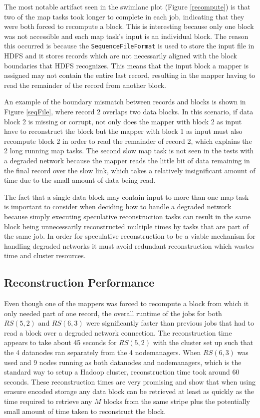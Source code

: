 \documentclass{ucetd}
\newcommand{\code}[1]{\texttt{#1}}
\begin{document}
The most notable artifact seen in the swimlane plot (Figure \ref{recompute}) is
that two of the map tasks took longer to complete in each job, indicating that
they were both forced to recompute a block. This is interesting because only one
block was not accessible and each map task's input is an individual block. The
reason this occurred is because the \code{SequenceFileFormat} is used to store
the input file in HDFS and it stores records which are not necessarily aligned
with the block boundaries that HDFS recognizes.  This means that the input block
a mapper is assigned may not contain the entire last record, resulting in the
mapper having to read the remainder of the record from another block.

An example of the boundary mismatch between records and blocks is shown in
Figure \ref{seqFile}, where record 2 overlaps two data blocks. In
this scenario, if data block 2 is missing or corrupt, not only does the mapper
with block 2 as input have to reconstruct the block but the mapper with block 1
as input must also recompute block 2 in order to read the remainder of record 2,
which explains the 2 long running map tasks. The second slow map task is not
seen in the tests with a degraded network because the mapper reads the little
bit of data remaining in the final record over the slow link, which takes a
relatively insignificant amount of time due to the small amount of data being
read.

The fact that a single data block may contain input to more than one map task is
important to consider when deciding how to handle a degraded network because
simply executing speculative reconstruction tasks can result in the same block
being unnecessarily reconstructed multiple times by tasks that are part of the
same job.  In order for speculative reconstruction to be a viable mechanism for
handling degraded networks it must avoid redundant reconstruction which wastes
time and cluster resources.

\subsection{Reconstruction Performance}

Even though one of the mappers was forced to recompute a block from which it
only needed part of one record, the overall runtime of the jobs for both
$RS(5,2)$ and $RS(6,3)$ were significantly faster than previous jobs that had to
read a block over a degraded network connection.  The reconstruction time
appears to take about 45 seconds for $RS(5,2)$ with the cluster set up such that
the 4 datanodes ran separately from the 4 nodemanagers.  When $RS(6,3)$ was used
and 9 nodes running as both datanodes and nodemanagers, which is the standard
way to setup a Hadoop cluster, reconstruction time took around 60 seconds. These
reconstruction times are very promising and show that when using erasure encoded
storage any data block can be retrieved at least as quickly as the time required
to retrieve any $M$ blocks from the same stripe plus the potentially small
amount of time taken to reconstruct the block.
\end{document}
